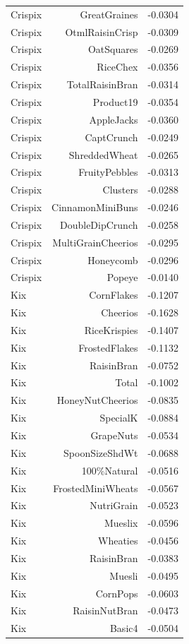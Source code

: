 \begin{longtable}{@{}lrr@{}}
Crispix & GreatGraines & -0.0304 \\
Crispix & OtmlRaisinCrisp & -0.0309 \\
Crispix & OatSquares & -0.0269 \\
Crispix & RiceChex & -0.0356 \\
Crispix & TotalRaisinBran & -0.0314 \\
Crispix & Product19 & -0.0354 \\
Crispix & AppleJacks & -0.0360 \\
Crispix & CaptCrunch & -0.0249 \\
Crispix & ShreddedWheat & -0.0265 \\
Crispix & FruityPebbles & -0.0313 \\
Crispix & Clusters & -0.0288 \\
Crispix & CinnamonMiniBuns & -0.0246 \\
Crispix & DoubleDipCrunch & -0.0258 \\
Crispix & MultiGrainCheerios & -0.0295 \\
Crispix & Honeycomb & -0.0296 \\
Crispix & Popeye & -0.0140 \\
Kix & CornFlakes & -0.1207 \\
Kix & Cheerios & -0.1628 \\
Kix & RiceKrispies & -0.1407 \\
Kix & FrostedFlakes & -0.1132 \\
Kix & RaisinBran & -0.0752 \\
Kix & Total & -0.1002 \\
Kix & HoneyNutCheerios & -0.0835 \\
Kix & SpecialK & -0.0884 \\
Kix & GrapeNuts & -0.0534 \\
Kix & SpoonSizeShdWt & -0.0688 \\
Kix & 100\%Natural & -0.0516 \\
Kix & FrostedMiniWheats & -0.0567 \\
Kix & NutriGrain & -0.0523 \\
Kix & Mueslix & -0.0596 \\
Kix & Wheaties & -0.0456 \\
Kix & RaisinBran & -0.0383 \\
Kix & Muesli & -0.0495 \\
Kix & CornPops & -0.0603 \\
Kix & RaisinNutBran & -0.0473 \\
Kix & Basic4 & -0.0504 \\

\end{longtable}
